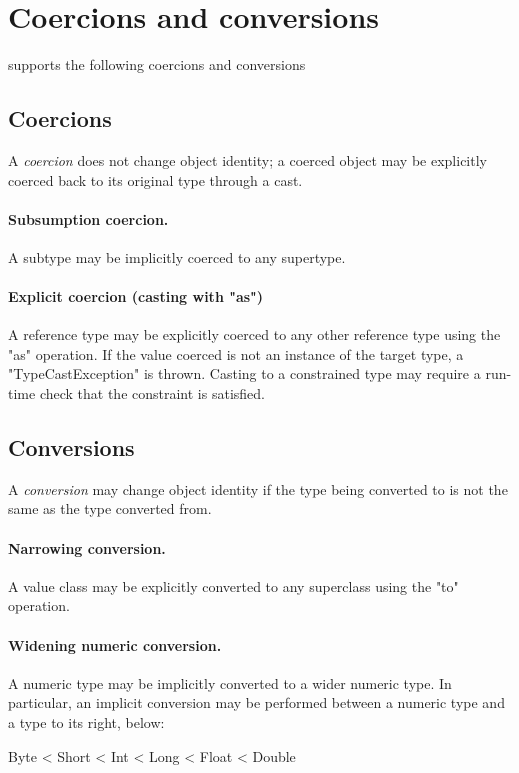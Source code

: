 \section{Coercions and conversions}
\label{XtenConversions}

\XtenCurrVer{} supports the following coercions and conversions

\subsection{Coercions}

A {\em coercion} does not change object identity;
a coerced object may be explicitly coerced back to its original
type through a cast.

\paragraph{Subsumption coercion.}
A subtype may be implicitly coerced to any supertype.

\paragraph{Explicit coercion (casting with \xcd"as")}
A reference type may be explicitly coerced to any other
reference type using the \xcd"as" operation.
If the value coerced is not an instance of the target type,
a \xcd"TypeCastException" is thrown.  Casting to a constrained
type may require a run-time check that the constraint is
satisfied.

\subsection{Conversions}

A {\em conversion} may change object identity if the type being
converted to is not the same as the type converted from.

\paragraph{Narrowing conversion.}
A value class may be explicitly converted to any superclass
using the \xcd"to" operation.


\paragraph{Widening numeric conversion.}
A numeric type may be implicitly converted to a wider
numeric type.
In particular, an implicit conversion may be performed between
a numeric type and a type to its right, below:
\begin{xten}
Byte < Short < Int < Long < Float < Double
\end{xten}

